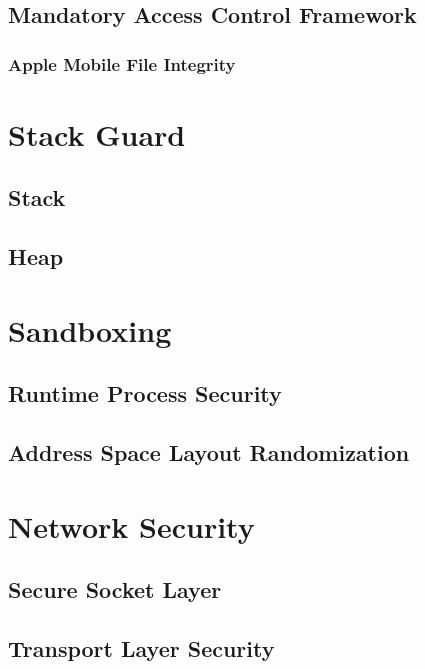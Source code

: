 \subsection{Mandatory Access Control Framework}
\label{sec:MACF}
\subsubsection{Apple Mobile File Integrity}
\label{sec:AMAFI}

\section{Stack Guard}
\label{sec:StackGuard}
\subsection{Stack}
\label{sec:Stack}
\subsection{Heap}
\label{sec:Heap}

\section{Sandboxing}
\label{sec:Sandboxing}

\subsection{Runtime Process Security}
\label{sec:RuntimeProcessSecurity}

\subsection{Address Space Layout Randomization}
\label{sec:ASLR}

\section{Network Security}
\label{sec:NetworkSecurity}

\subsection{Secure Socket Layer}
\label{sec:SSL}

\subsection{Transport Layer Security}
\label{sec:TLS}


